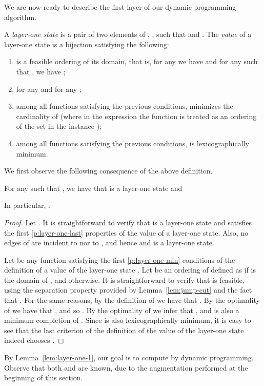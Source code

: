 We are now ready to describe the first layer of our dynamic programming algorithm.
\begin{definition}
A \emph{layer-one state} is a pair  of two elements of ,
,  such that 
 and .
The \emph{value} of a layer-one state  is a bijection
 satisfying the following:
\begin{enumerate}
\item  is a feasible ordering of its domain, that is,
  for any  we have  and
  for any  such that , we have
  ;
\item  for any  and
 for any ;
  \label{p:layer-one-last}
\item among all functions  satisfying the previous conditions,\label{p:layer-one-min}
   minimizes the cardinality of  
(where in the expression  the function  is treated as an ordering of the set 
 in the \spic{} instance );
\item among all functions  satisfying the previous conditions, 
 is lexicographically minimum.
\end{enumerate}
\end{definition}

We first observe the following consequence of the above definition.
\begin{lemma}\label{lem:layer-one-1}
For any  such that , we have that  is a layer-one state and

In particular, .
\end{lemma}
\begin{proof}
Let . It is straightforward to verify that  is a layer-one state
and  satisfies the first \ref{p:layer-one-last} properties of the value of a layer-one state.
Also, no edges of  are incident to  nor to , and hence  and
 is a layer-one state.

Let  be any function satisfying the first \ref{p:layer-one-min} conditions of the definition
of a value of the layer-one state .
Let  be an ordering of  defined as  if  is the domain of , and  otherwise.
It is straightforward to verify that  is feasible, using the separation property provided by Lemma~\ref{lem:jump-cut} and the fact that .
For the same reasons, by the definition of  we have that . By the optimality of  we have that , and so . By the optimality of  we infer that , and  is also a minimum completion of .
Since  is also lexicographically minimum, it is easy to see that the last criterion of the definition of the value of the layer-one state  indeed chooses .
\end{proof}
By Lemma~\ref{lem:layer-one-1}, our goal is to compute  by dynamic programming. Observe
that both  and  are known, due to the augmentation performed at the beginning of this section.

